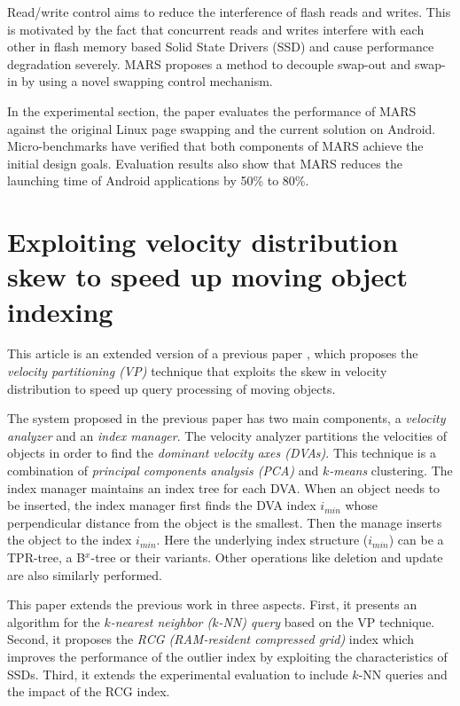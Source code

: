 \documentclass[paper=a4, fontsize=18pt]{article} %
\numberwithin{equation}{section} %
\numberwithin{figure}{section} %
\numberwithin{table}{section} %
\begin{document}
Read/write control aims to reduce the interference of flash reads and writes. This is motivated by the fact that concurrent reads and writes interfere with each other in flash memory based Solid State Drivers (SSD) and cause performance degradation severely. MARS proposes a method to decouple swap-out and swap-in by using a novel swapping control mechanism.

In the experimental section, the paper evaluates the performance of MARS against the original Linux page swapping and the current solution on Android. Micro-benchmarks have verified that both components of MARS achieve the initial design goals. Evaluation results also show that MARS reduces the launching time of Android applications by 50\% to 80\%.

\section{Exploiting velocity distribution skew to speed up moving object indexing \cite{NH0W15}}

This article is an extended version of a previous paper \cite{NHZW12}, which proposes the \emph{velocity partitioning (VP)} technique that exploits the skew in velocity distribution to speed up query processing of moving objects.

The system proposed in the previous paper has two main components, a \emph{velocity analyzer} and an \emph{index manager}. The velocity analyzer partitions the velocities of objects in order to find the \emph{dominant velocity axes (DVAs)}. This technique is a combination of \emph{principal components analysis (PCA)} and \emph{$k$-means} clustering. The index manager maintains an index tree for each DVA. When an object needs to be inserted, the index manager first finds the DVA index $i_{min}$ whose perpendicular distance from the object is the smallest. Then the manage inserts the object to the index $i_{min}$. Here the underlying index structure ($i_{min}$) can be a TPR-tree, a B$^x$-tree or their variants. Other operations like deletion and update are also similarly performed.

This paper extends the previous work in three aspects. First, it presents an algorithm for the \emph{$k$-nearest neighbor ($k$-NN) query} based on the VP technique. Second, it proposes the \emph{RCG (RAM-resident compressed grid)} index which improves the performance of the outlier index by exploiting the characteristics of SSDs. Third, it extends the experimental evaluation to include $k$-NN queries and the impact of the RCG index.
\end{document}

